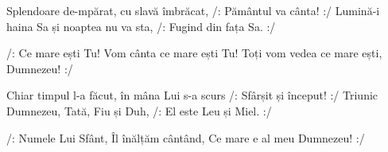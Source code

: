 \beginverse
Splendoare de-mpărat, cu slavă îmbrăcat,
/: Pământul va cânta! :/
Lumină-i haina Sa și noaptea nu va sta,
/: Fugind din fața Sa. :/
\endverse

\beginchorus
/: Ce mare ești Tu!
Vom cânta ce mare ești Tu!
Toți vom vedea ce mare ești, Dumnezeu! :/
\endchorus

\beginverse
Chiar timpul l-a făcut, în mâna Lui s-a scurs
/: Sfârșit și început! :/
Triunic Dumnezeu, Tată, Fiu și Duh,
/: El este Leu și Miel. :/
\endverse

\beginverse*
/: Numele Lui Sfânt, Îl înălțăm cântând,
Ce mare e al meu Dumnezeu! :/
\endverse
\endsong